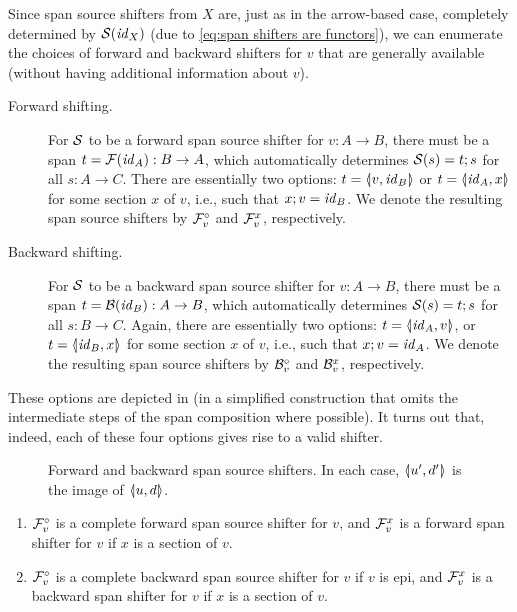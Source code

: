 Since span source shifters from $X$ are, just as in the arrow-based case, completely determined by $\mathcal{S}(\mathit{id}_X)$ (due to \eqref{eq:span shifters are functors}), we can enumerate the choices of forward and backward shifters for $v$ that are generally available (without having additional information about $v$).
%
\begin{description}
\item[Forward shifting.] For $\mathcal{S}$ to be a forward span source shifter for $v:A\to B$, there must be a span $t=\mathcal{F}(\mathit{id}_A):B\to A$, which automatically determines $\mathcal{S}(s)=t;s$ for all $s:A\to C$. There are essentially two options: $t=\spanof{v}{\id_B}$ or $t=\spanof{\id_A}{x}$ for some section $x$ of $v$, i.e., such that $x;v=\mathit{id}_B$. We denote the resulting span source shifters by $\mathcal{F}_v^\circ$ and $\mathcal{F}_v^x$, respectively.

\item[Backward shifting.] For $\mathcal{S}$ to be a backward span source shifter for $v:A\to B$, there must be a span $t=\mathcal{B}(\mathit{id}_B):A\to B$, which automatically determines $\mathcal{S}(s)=t;s$ for all $s:B\to C$. Again, there are essentially two options: $t=\spanof{\id_A}{v}$, or $t=\spanof{\id_B}{x}$ for some section $x$ of $v$, i.e., such that $x;v=\mathit{id}_A$. We denote the resulting span source shifters by $\mathcal{B}_v^\circ$ and $\mathcal{B}_v^x$, respectively.
\end{description}
%
These options are depicted in  (in a simplified construction that omits the intermediate steps of the span composition where possible). It turns out that, indeed, each of these four options gives rise to a valid shifter.
%
\begin{figure}
\centering

\caption{Forward and backward span source shifters. In each case, $\spanof{u'}{d'}$ is the image of $\spanof{u}{d}$.}
\end{figure}
%
\begin{proposition}
\begin{enumerate}
\item $\mathcal{F}_v^\circ$ is a complete forward span source shifter for $v$, and $\mathcal{F}_v^x$ is a forward span shifter for $v$ if $x$ is a section of $v$.
\item $\mathcal{F}_v^\circ$ is a complete backward span source shifter for $v$ if $v$ is epi, and $\mathcal{F}_v^x$ is a backward span shifter for $v$ if $x$ is a section of $v$.
\end{enumerate}
\end{proposition}


